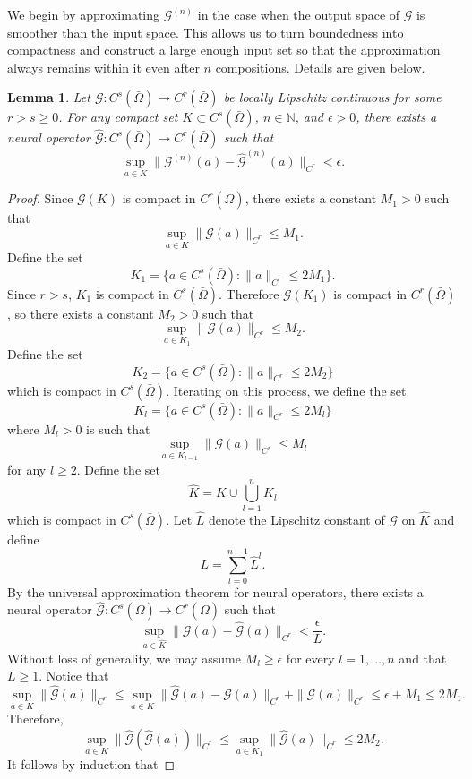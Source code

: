 \documentclass[preprint,11pt]{elsarticle}
\newtheorem{lemma}{Lemma}
\theoremstyle{plain}
\newcommand{\N}{\mathbb{N}}
\newcommand{\G}{\mathcal{G}}
\begin{document}
We begin by approximating $\G^{(n)}$ in the case when the output space of $\G$ is smoother than the input space. This allows us to turn boundedness 
into compactness and construct a large enough input set so that the approximation always remains within it even after $n$ compositions. Details are given below.

\begin{lemma}
    \label{lemma:compose_r_greater_s}
    Let $\G: C^s (\bar{\Omega}) \to C^r (\bar{\Omega})$ be locally Lipschitz continuous for some $r > s \geq0$. For any compact set $K \subset C^s (\bar{\Omega})$, $n \in \N$, and $\epsilon > 0$, there exists a neural operator $\hat{\G} : C^s (\bar{\Omega}) \to C^r (\bar{\Omega})$ such that
    \[\sup_{a \in K} \|\G^{(n)}(a) - \hat{\G}^{(n)}(a) \|_{C^r} < \epsilon.\]
\end{lemma}
\begin{proof}
    Since $\G(K)$ is compact in $C^r (\bar{\Omega})$, there exists a constant $M_1 > 0$ such that
    \[\sup_{a \in K} \|\G(a)\|_{C^r} \leq M_1.\]
    Define the set
    \[K_1  = \{a \in C^s(\bar{\Omega}) : \|a\|_{C^r} \leq 2M_1\}.\]
    Since $r > s$, $K_1$ is compact in $C^s(\bar{\Omega})$. Therefore $\G(K_1)$ is compact in $C^r (\bar{\Omega})$, so there exists a constant $M_2 > 0$ such that 
    \[\sup_{a \in K_1} \|\G(a)\|_{C^r} \leq M_2.\]
    Define the set 
    \[K_2 = \{a \in C^s(\bar{\Omega}) : \|a\|_{C^r} \leq 2 M_2\}\]
    which is compact in $C^s (\bar{\Omega})$. Iterating on this process, we define the set
    \[K_l = \{a \in C^s (\bar{\Omega}) : \|a\|_{C^r} \leq 2 M_l\}\] where $M_l > 0$ is such that
    \[\sup_{a \in K_{l-1}} \|\G(a)\|_{C^r} \leq M_l\]
    for any $l \geq 2.$ Define the set 
    \[\hat{K} = K \cup \bigcup_{l=1}^n K_l\]
    which is compact in $C^s (\bar{\Omega})$. Let $\hat{L}$ denote the Lipschitz constant of $\G$ on $\hat{K}$
    and define
    \[L = \sum_{l=0}^{n-1} \hat{L}^l.\]
    By the universal approximation theorem for neural operators, there exists a neural operator $\hat{\G} : C^s (\bar{\Omega}) \to C^r (\bar{\Omega})$
    such that 
    \[\sup_{a \in \hat{K}} \|\G(a) - \hat{\G}(a) \|_{C^r} < \frac{\epsilon}{L}.\]
    Without loss of generality, we may assume $M_l \geq \epsilon$ for every $l = 1,\dots,n$ and that $L \geq 1$. Notice that
    \[\sup_{a \in K} \|\hat{\G}(a)\|_{C^r} \leq \sup_{a \in K} \|\hat{\G}(a) - \G(a)\|_{C^r} + \|\G(a)\|_{C^r} \leq \epsilon + M_1 \leq 2M_1.\]
    Therefore,
    \[\sup_{a \in K} \|\hat{\G}(\hat{\G}(a))\|_{C^r} \leq \sup_{a \in K_1} \|\hat{\G}(a)\|_{C^r} \leq 2 M_2.\]
    It follows by induction that

\end{proof}
\end{document}
